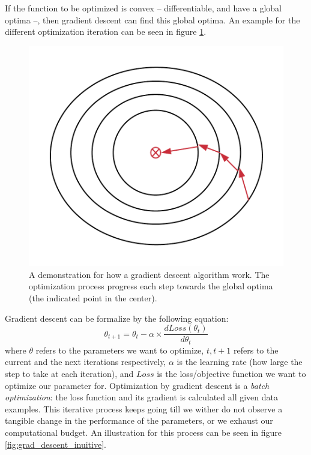 \par If the function to be optimized is convex \citep{convexfn} -- differentiable, and have a global optima --, then gradient descent can find this global optima. An example for the different optimization iteration can be seen in figure \ref{fig:grad_descent}.

\begin{figure}
    \centering
    \includegraphics{images/gbem/grad_descent.png}
    \caption{A demonstration for how a gradient descent algorithm work. The optimization process progress each step towards the global optima (the indicated point in the center).}
    \label{fig:grad_descent}
\end{figure}

\par Gradient descent can be formalize by the following equation:
\begin{equation}
    \theta_{t+1} = \theta_{t} - \alpha \times \frac{d Loss(\theta_t)}{d\theta_t}
    \label{eq:grad_descent}
\end{equation}
where $\theta$ refers to the parameters we want to optimize, $t,t+1$ refers to the current and the next iterations respectively, $\alpha$ is the learning rate (how large the step to take at each iteration), and $Loss$ is the loss/objective function we want to optimize our parameter for. Optimization by gradient descent is a \textit{batch optimization}: the loss function and its gradient is calculated all given data examples. This iterative process keeps going till we wither do not observe a tangible change in the performance of the parameters, or we exhaust our computational budget. An illustration for this process can be seen in figure \ref{fig:grad_descent_inuitive}.

